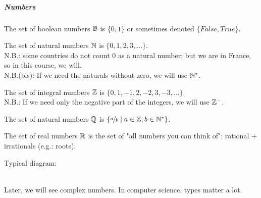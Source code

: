 \subparagraph{Numbers}
\begin{definition}[Booleans]
    The set of boolean numbers $\mathbb{B}$ is $\{0,1\}$ or sometimes denoted $\{False, True\}$.\\
\end{definition}
\begin{definition}[Naturals]
    The set of natural numbers $\mathbb{N}$ is $\{0,1,2,3,\dots\}$.\\
    N.B.: some countries do not count $0$ as a natural number; but we are in France, so in this course, we will.\\
    N.B.(bis): If we need the naturals without zero, we will use $\mathbb{N}^*$.
\end{definition}
\begin{definition}[Integers]
    The set of integral numbers $\mathbb{Z}$ is $\{0,1,-1,2,-2,3,-3,\dots\}$.\\
    N.B.: If we need only the negative part of the integers, we will use $\mathbb{Z}^-$.
\end{definition}
\begin{definition}
    The set of natural numbers $\mathbb{Q}$ is $\{\nicefrac{a}{b} \mid a \in \mathbb{Z}, b \in \mathbb{N}^*\}$.\\
\end{definition}
\begin{definition}[Reals]
    The set of real numbers $\mathbb{R}$ is the set of "all numbers you can think of": rational + irrationals (e.g.: roots). 
\end{definition}
Typical diagram:\\
\\
Later, we will see complex numbers.
In computer science, types matter a lot.

